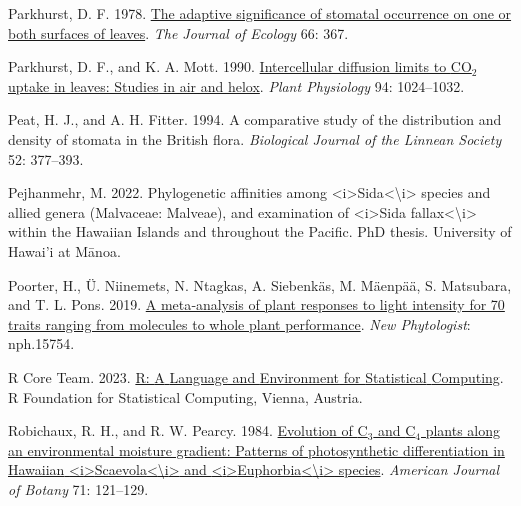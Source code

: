 \documentclass[
  letterpaper,
  DIV=11,
  numbers=noendperiod]{scrartcl}
\newlength{\cslhangindent}
\newlength{\cslentryspacingunit} %
\newenvironment{CSLReferences}[2] %
 {%
  \setlength{\parindent}{0pt}
  \ifodd #1
  \let\oldpar\par
  \def\par{\hangindent=\cslhangindent\oldpar}
  \fi
  \setlength{\parskip}{#2\cslentryspacingunit}
 }%
 {}
\begin{document}
\begin{CSLReferences}{1}{0}
\leavevmode{}%
Parkhurst, D. F. 1978. \href{https://doi.org/10.2307/2259142}{The
adaptive significance of stomatal occurrence on one or both surfaces of
leaves}. \emph{The Journal of Ecology} 66: 367.

\leavevmode{}%
Parkhurst, D. F., and K. A. Mott. 1990.
\href{https://doi.org/10.1104/pp.94.3.1024}{Intercellular diffusion
limits to {CO}\(_{\textrm{2}}\) uptake in leaves: Studies in air and
helox}. \emph{Plant Physiology} 94: 1024--1032.

\leavevmode{}%
Peat, H. J., and A. H. Fitter. 1994. A comparative study of the
distribution and density of stomata in the {British} flora.
\emph{Biological Journal of the Linnean Society} 52: 377--393.

\leavevmode{}%
Pejhanmehr, M. 2022. Phylogenetic affinities among
{\textless{}}i{\textgreater{}}{Sida}{\textless{}}{\textbackslash{}}i{\textgreater{}}
species and allied genera ({Malvaceae}: {Malveae}), and examination of
{\textless{}}i{\textgreater{}}{Sida}
fallax{\textless{}}{\textbackslash{}}i{\textgreater{}} within the
{Hawaiian} {Islands} and throughout the {Pacific}. PhD thesis.
University of Hawai'i at Mānoa.

\leavevmode{}%
Poorter, H., Ü. Niinemets, N. Ntagkas, A. Siebenkäs, M. Mäenpää, S.
Matsubara, and T. L. Pons. 2019.
\href{https://doi.org/10.1111/nph.15754}{A meta‐analysis of plant
responses to light intensity for 70 traits ranging from molecules to
whole plant performance}. \emph{New Phytologist}: nph.15754.

\leavevmode{}%
R Core Team. 2023. \href{http://www.R-project.org/}{R: {A} {Language}
and {Environment} for {Statistical} {Computing}}. R Foundation for
Statistical Computing, Vienna, Austria.

\leavevmode{}%
Robichaux, R. H., and R. W. Pearcy. 1984.
\href{https://doi.org/10.1002/j.1537-2197.1984.tb12492.x}{Evolution of
{C}\(_{\textrm{3}}\) and {C}\(_{\textrm{4}}\) plants along an
environmental moisture gradient: Patterns of photosynthetic
differentiation in {Hawaiian}
{\textless{}}i{\textgreater{}}{Scaevola}{\textless{}}{\textbackslash{}}i{\textgreater{}}
and
{\textless{}}i{\textgreater{}}{Euphorbia}{\textless{}}{\textbackslash{}}i{\textgreater{}}
species}. \emph{American Journal of Botany} 71: 121--129.


\end{CSLReferences}
\end{document}
